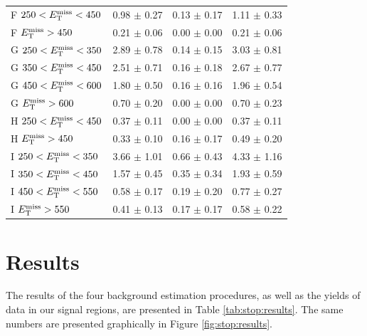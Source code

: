 \begin{table}[htbp]
\begin{tabular}{|l|cc|c|}
 F $250<E_\text{T}^\text{miss}<450$ & 0.98 $\pm$ 0.27   & 0.13 $\pm$ 0.17   & 1.11 $\pm$ 0.33   \\
 F $E_\text{T}^\text{miss}>450$ & 0.21 $\pm$ 0.06   & 0.00 $\pm$ 0.00   & 0.21 $\pm$ 0.06   \\
 G $250<E_\text{T}^\text{miss}<350$ & 2.89 $\pm$ 0.78   & 0.14 $\pm$ 0.15   & 3.03 $\pm$ 0.81   \\
 G $350<E_\text{T}^\text{miss}<450$ & 2.51 $\pm$ 0.71   & 0.16 $\pm$ 0.18   & 2.67 $\pm$ 0.77   \\
 G $450<E_\text{T}^\text{miss}<600$ & 1.80 $\pm$ 0.50   & 0.16 $\pm$ 0.16   & 1.96 $\pm$ 0.54   \\
 G $E_\text{T}^\text{miss}>600$ & 0.70 $\pm$ 0.20   & 0.00 $\pm$ 0.00   & 0.70 $\pm$ 0.23   \\
 H $250<E_\text{T}^\text{miss}<450$ & 0.37 $\pm$ 0.11   & 0.00 $\pm$ 0.00   & 0.37 $\pm$ 0.11   \\
 H $E_\text{T}^\text{miss}>450$ & 0.33 $\pm$ 0.10   & 0.16 $\pm$ 0.17   & 0.49 $\pm$ 0.20   \\
 I $250<E_\text{T}^\text{miss}<350$ & 3.66 $\pm$ 1.01   & 0.66 $\pm$ 0.43   & 4.33 $\pm$ 1.16   \\
 I $350<E_\text{T}^\text{miss}<450$ & 1.57 $\pm$ 0.45   & 0.35 $\pm$ 0.34   & 1.93 $\pm$ 0.59   \\
 I $450<E_\text{T}^\text{miss}<550$ & 0.58 $\pm$ 0.17   & 0.19 $\pm$ 0.20   & 0.77 $\pm$ 0.27   \\
 I $E_\text{T}^\text{miss}>550$ & 0.41 $\pm$ 0.13   & 0.17 $\pm$ 0.17   & 0.58 $\pm$ 0.22   \\
\hline
\end{tabular}
\end{table}

\section{Results}
\label{sec:stop:results}

The results of the four background estimation procedures, as well as
the yields of data in our signal regions, are presented in Table
\ref{tab:stop:results}. The same numbers are presented graphically in
Figure \ref{fig:stop:results}.

